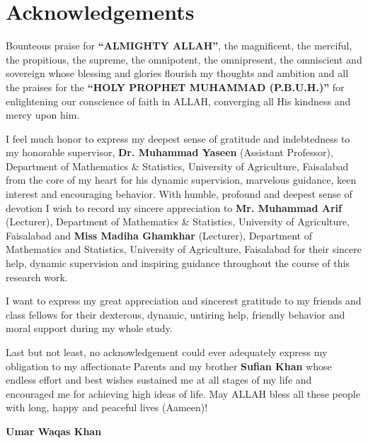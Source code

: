 \chapter*{Acknowledgements}
\vspace{7mm}
Bounteous praise for \textbf{``ALMIGHTY ALLAH''}, the magnificent, the merciful, the propitious, the supreme, the omnipotent, the omnipresent, the omniscient and sovereign whose blessing and glories flourish my thoughts and ambition and all the praises for the \textbf{``HOLY PROPHET MUHAMMAD (P.B.U.H.)''} for enlightening our conscience of faith in ALLAH, converging all His kindness and mercy upon him.

I feel much honor to express my deepest sense of gratitude and indebtedness to my honorable supervisor, \textbf{Dr. Muhammad Yaseen} (Assistant Professor), Department of Mathematics \& Statistics, University of Agriculture, Faisalabad from the core of my heart for his dynamic supervision, marvelous guidance, keen interest and encouraging behavior. With humble, profound and deepest sense of devotion I wish to record my sincere appreciation to \textbf{Mr. Muhammad Arif} (Lecturer), Department of Mathematics \& Statistics, University of Agriculture, Faisalabad and \textbf{Miss Madiha Ghamkhar} (Lecturer), Department of Mathematics and Statistics, University of Agriculture, Faisalabad for their sincere help, dynamic supervision and inspiring guidance throughout the course of this research work.

I want to express my great appreciation and sincerest gratitude to my friends and class fellows for their dexterous, dynamic, untiring help, friendly behavior and moral support during my whole study.

Last but not least, no acknowledgement could ever adequately express my obligation to my affectionate Parents and my brother \textbf{Sufian Khan} whose endless effort and best wishes sustained me at all stages of my life and encouraged me for achieving high ideas of life. May ALLAH bless all these people with long, happy and peaceful lives (Aameen)!
\begin{flushright}
\textbf{Umar Waqas Khan}
\end{flushright}
